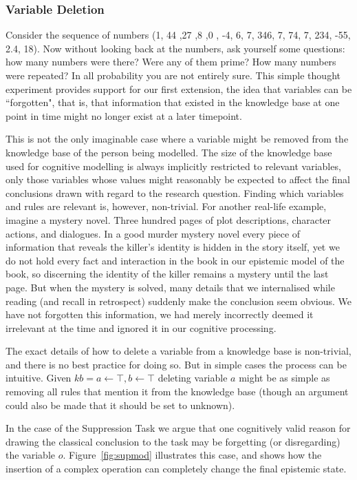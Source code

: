\documentclass{article}
\begin{document}
\subsubsection*{Variable Deletion}

Consider the sequence of numbers (1, 44 ,27 ,8 ,0 , -4, 6, 7, 346, 7, 74, 7, 234, -55, 2.4, 18). Now without looking back at the numbers, ask yourself some questions: how many numbers were there? Were any of them prime? How many numbers were repeated? In all probability you are not entirely sure. This simple thought experiment provides support for our first extension, the idea that variables can be ``forgotten", that is, that information that existed in the knowledge base at one point in time might no longer exist at a later timepoint. 

This is not the only imaginable case where a variable might be removed from the knowledge base of the person being modelled. The size of the knowledge base used for cognitive modelling is always implicitly restricted to relevant variables, only those variables whose values might reasonably be expected to affect the final conclusions drawn with regard to the research question. Finding which variables and rules are relevant is, however, non-trivial. For another real-life example, imagine a mystery novel. Three hundred pages of plot descriptions, character actions, and dialogues. In a good murder mystery novel every piece of information that reveals the killer's identity is hidden in the story itself, yet we do not hold every fact and interaction in the book in our epistemic model of the book, so discerning the identity of the killer remains a mystery until the last page. But when the mystery is solved, many details that we internalised while reading (and recall in retrospect) suddenly make the conclusion seem obvious. We have not forgotten this information, we had merely incorrectly deemed it irrelevant at the time and ignored it in our cognitive processing.

The exact details of how to delete a variable from a knowledge base is non-trivial, and there is no best practice for doing so. But in simple cases the process can be intuitive. Given $kb={a\leftarrow\top, b\leftarrow \top}$ deleting variable $a$ might be as simple as removing all rules that mention it from the knowledge base (though an argument could also be made that it should be set to unknown).

In the case of the Suppression Task we argue that one cognitively valid reason for drawing the classical conclusion to the task may be forgetting (or disregarding) the variable $o$. Figure~\ref{fig:supmod} illustrates this case, and shows how the insertion of a complex operation can completely change the final epistemic state.
\end{document}
